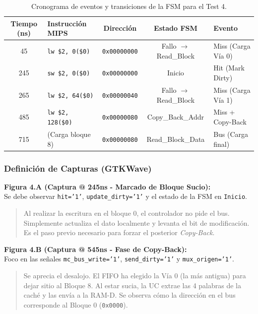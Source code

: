 \documentclass[12pt,a4paper]{article}
\begin{document}
\begin{table}[H]
\centering
\small
\renewcommand{\arraystretch}{1.2}
\begin{tabular}{|c|l|c|c|l|}
\hline
\rowcolor[HTML]{EFEFEF} 
\textbf{Tiempo (ns)} & \textbf{Instrucción MIPS} & \textbf{Dirección} & \textbf{Estado FSM} & \textbf{Evento} \\ \hline
45  & \texttt{lw \$2, 0(\$0)}    & \texttt{0x00000000} & Fallo $\rightarrow$ Read\_Block & Miss (Carga Vía 0) \\ \hline
245 & \texttt{sw \$2, 0(\$0)}    & \texttt{0x00000000} & Inicio                 & Hit (Mark Dirty)   \\ \hline
265 & \texttt{lw \$2, 64(\$0)}   & \texttt{0x00000040} & Fallo $\rightarrow$ Read\_Block & Miss (Carga Vía 1) \\ \hline
485 & \texttt{lw \$2, 128(\$0)}  & \texttt{0x00000080} & Copy\_Back\_Addr       & Miss + Copy-Back   \\ \hline
715 & (Carga bloque 8)           & \texttt{0x00000080} & Read\_Block\_Data      & Bus (Carga final)  \\ \hline
\end{tabular}
\caption{Cronograma de eventos y transiciones de la FSM para el Test 4.}
\end{table}

\subsubsection*{Definición de Capturas (GTKWave)}

\textbf{Figura 4.A (Captura @ 245ns - Marcado de Bloque Sucio):} \\
Se debe observar \texttt{hit='1'}, \texttt{update\_dirty='1'} y el estado de la FSM en \texttt{Inicio}.
\begin{quote}
     Al realizar la escritura en el bloque 0, el controlador no pide el bus. Simplemente actualiza el dato localmente y levanta el bit de modificación. Es el paso previo necesario para forzar el posterior \textit{Copy-Back}.
\end{quote}

\textbf{Figura 4.B (Captura @ 545ns - Fase de Copy-Back):} \\
Foco en las señales \texttt{mc\_bus\_write='1'}, \texttt{send\_dirty='1'} y \texttt{mux\_origen='1'}.
\begin{quote}
     Se aprecia el desalojo. El FIFO ha elegido la Vía 0 (la más antigua) para dejar sitio al Bloque 8. Al estar sucia, la UC extrae las 4 palabras de la caché y las envía a la RAM-D. Se observa cómo la dirección en el bus corresponde al Bloque 0 (\texttt{0x0000}).
\end{quote}
\end{document}

